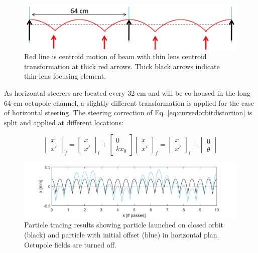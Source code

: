 \begin{figure}
\centering
\includegraphics[width=\textwidth]{5.figures/steeringtolerance/horz_bg_field_distortion_cartoon.png}
\caption{Red line is centroid motion of beam with thin lens centroid transformation at thick red arrows. Thick black arrows indicate thin-lens focusing element.}
\label{fig:horzcurvedorbitdistortion}
\end{figure}

As horizontal steerers are located every 32 cm and will be co-housed in the long 64-cm octupole channel, a slightly different transformation is applied for the case of horizontal steering. The steering correction of Eq. \ref{eq:curvedorbitdistortion} is split and applied at different locations: 

\begin{subequations}
\begin{equation}
\begin{bmatrix} x \\ x' \end{bmatrix}_f = \begin{bmatrix} x \\ x' \end{bmatrix}_i + \begin{bmatrix} 0 \\ kx_0 \end{bmatrix}
\label{eq:horzcurvedorbitdistortion1}
\end{equation}
\begin{equation}
\begin{bmatrix} x \\ x' \end{bmatrix}_f = \begin{bmatrix} x \\ x' \end{bmatrix}_i + \begin{bmatrix} 0 \\ \theta \end{bmatrix}
\label{eq:horzcurvedorbitdistortion2}
\end{equation}
\end{subequations}

\begin{figure}
\centering
\includegraphics[width=\textwidth]{5.figures/steeringtolerance/sp_traces.png}
\caption{Particle tracing results showing particle launched on closed orbit (black) and particle with initial offset (blue) in horizontal plan. Octupole fields are turned off.}
\label{fig:horsptraces}
\end{figure}

